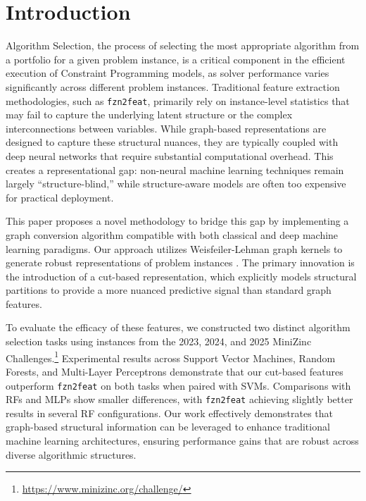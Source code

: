 \section{Introduction}
Algorithm Selection, the process of selecting the most appropriate algorithm from a portfolio for a given problem instance, is a critical component in the efficient execution of Constraint Programming models, as solver performance varies significantly across different problem instances. Traditional feature extraction methodologies, such as \texttt{fzn2feat}, primarily rely on instance-level statistics that may fail to capture the underlying latent structure or the complex interconnections between variables. While graph-based representations are designed to capture these structural nuances, they are typically coupled with deep neural networks that require substantial computational overhead. This creates a representational gap: non-neural machine learning techniques remain largely ``structure-blind,'' while structure-aware models are often too expensive for practical deployment.

This paper proposes a novel methodology to bridge this gap by implementing a graph conversion algorithm compatible with both classical and deep machine learning paradigms. Our approach utilizes Weisfeiler-Lehman graph kernels to generate robust representations of problem instances \citep{morris2023weisfeiler}. The primary innovation is the introduction of a cut-based representation, which explicitly models structural partitions to provide a more nuanced predictive signal than standard graph features.

To evaluate the efficacy of these features, we constructed two distinct algorithm selection tasks using instances from the 2023, 2024, and 2025 MiniZinc Challenges.\footnote{\url{https://www.minizinc.org/challenge/}} Experimental results across Support Vector Machines, Random Forests, and Multi-Layer Perceptrons demonstrate that our cut-based features outperform \texttt{fzn2feat} on both tasks when paired with SVMs. Comparisons with RFs and MLPs show smaller differences, with \texttt{fzn2feat} achieving slightly better results in several RF configurations. Our work effectively demonstrates that graph-based structural information can be leveraged to enhance traditional machine learning architectures, ensuring performance gains that are robust across diverse algorithmic structures.

